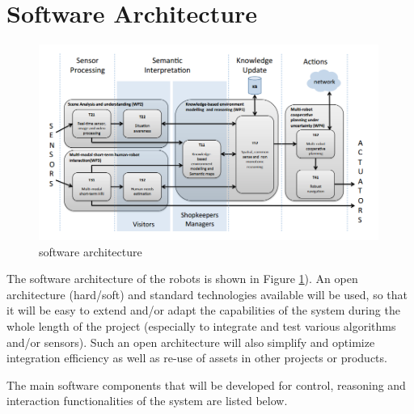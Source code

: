 \section{Software Architecture}

\begin{figure}
\centering
\includegraphics[width=0.99\textwidth]{fig/COACHES_swarch.png}
\caption{\coaches software architecture}
\label{fig:swarch}
\end{figure}

The software architecture of the \coaches robots is shown in Figure \ref{fig:swarch}).
An open architecture (hard/soft) and standard technologies available will be used, 
so that it will be easy to extend and/or adapt the capabilities of the system during the whole length of  the  project  (especially  to  integrate  and  test  various  algorithms  and/or  sensors).  
Such an open architecture will also simplify and optimize integration efficiency as well as re-use of assets in other projects or products. 



The main software components that will be developed for control, reasoning and interaction functionalities of the system are listed below.

